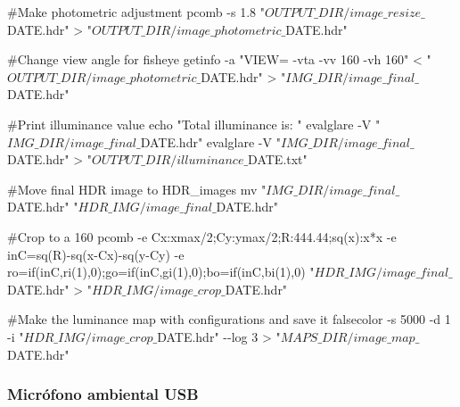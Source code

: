 \documentclass[
  letterpaper,
]{scrbook}
\newenvironment{Shaded}{\begin{snugshade}}{\end{snugshade}}
\newcommand{\CommentTok}[1]{\textcolor[rgb]{0.37,0.37,0.37}{#1}}
\newcommand{\DecValTok}[1]{\textcolor[rgb]{0.68,0.00,0.00}{#1}}
\newcommand{\FloatTok}[1]{\textcolor[rgb]{0.68,0.00,0.00}{#1}}
\newcommand{\NormalTok}[1]{\textcolor[rgb]{0.00,0.23,0.31}{#1}}
\newcommand{\OperatorTok}[1]{\textcolor[rgb]{0.37,0.37,0.37}{#1}}
\newcommand{\StringTok}[1]{\textcolor[rgb]{0.13,0.47,0.30}{#1}}
\begin{document}
\begin{Shaded}
\begin{Highlighting}[]
\CommentTok{\#Make photometric adjustment}
\NormalTok{pcomb }\OperatorTok{{-}}\NormalTok{s }\FloatTok{1.8} \StringTok{"$OUTPUT\_DIR/image\_resize\_$DATE.hdr"} \OperatorTok{\textgreater{}} \StringTok{"$OUTPUT\_DIR/image\_photometric\_$DATE.hdr"}

\CommentTok{\#Change view angle for fisheye}
\NormalTok{getinfo }\OperatorTok{{-}}\NormalTok{a }\StringTok{"VIEW= {-}vta {-}vv 160 {-}vh 160"} \OperatorTok{\textless{}} \StringTok{"$OUTPUT\_DIR/image\_photometric\_$DATE.hdr"} \OperatorTok{\textgreater{}} \StringTok{"$IMG\_DIR/image\_final\_$DATE.hdr"}

\CommentTok{\#Print illuminance value}
\NormalTok{echo }\StringTok{"Total illuminance is: "}
\NormalTok{evalglare }\OperatorTok{{-}}\NormalTok{V }\StringTok{"$IMG\_DIR/image\_final\_$DATE.hdr"}
\NormalTok{evalglare }\OperatorTok{{-}}\NormalTok{V }\StringTok{"$IMG\_DIR/image\_final\_$DATE.hdr"} \OperatorTok{\textgreater{}} \StringTok{"$OUTPUT\_DIR/illuminance\_$DATE.txt"}

\CommentTok{\#Move final HDR image to HDR\_images}
\NormalTok{mv }\StringTok{"$IMG\_DIR/image\_final\_$DATE.hdr"} \StringTok{"$HDR\_IMG/image\_final\_$DATE.hdr"}

\CommentTok{\#Crop to a 160}
\NormalTok{pcomb }\OperatorTok{{-}}\NormalTok{e }\StringTok{\textquotesingle{}Cx:xmax/2;Cy:ymax/2;R:444.44;sq(x):x*x\textquotesingle{}} \OperatorTok{{-}}\NormalTok{e }\StringTok{\textquotesingle{}inC=sq(R){-}sq(x{-}Cx){-}sq(y{-}Cy)\textquotesingle{}} \OperatorTok{{-}}\NormalTok{e }\StringTok{\textquotesingle{}ro=if(inC,ri(1),0);go=if(inC,gi(1),0);bo=if(inC,bi(1),0)\textquotesingle{}} \StringTok{"$HDR\_IMG/image\_final\_$DATE.hdr"} \OperatorTok{\textgreater{}} \StringTok{"$HDR\_IMG/image\_crop\_$DATE.hdr"}

\CommentTok{\#Make the luminance map with configurations and save it}
\NormalTok{falsecolor }\OperatorTok{{-}}\NormalTok{s }\DecValTok{5000} \OperatorTok{{-}}\NormalTok{d }\DecValTok{1} \OperatorTok{{-}}\NormalTok{i }\StringTok{"$HDR\_IMG/image\_crop\_$DATE.hdr"} \OperatorTok{{-}{-}}\NormalTok{log }\DecValTok{3} \OperatorTok{\textgreater{}} \StringTok{"$MAPS\_DIR/image\_map\_$DATE.hdr"}
\end{Highlighting}
\end{Shaded}

\subsubsection{Micrófono ambiental
USB}\label{micruxf3fono-ambiental-usb}
\end{document}
